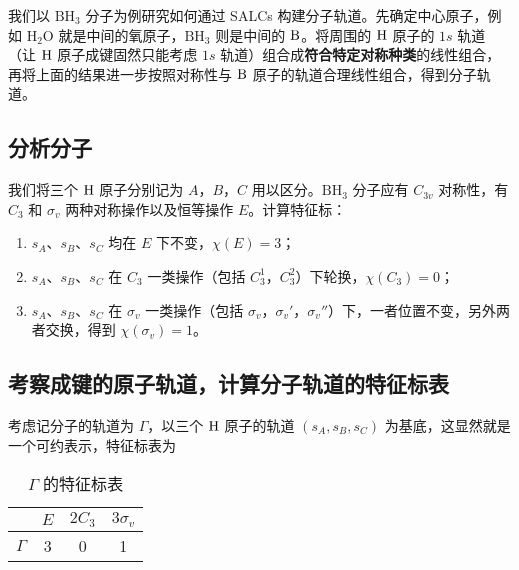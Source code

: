 
我们以 $\text{BH}_3$ 分子为例研究如何通过 SALCs 构建分子轨道。先确定中心原子，例如 $\text{H}_2\text{O}$ 就是中间的氧原子，$\text{BH}_3$ 则是中间的 $\text B$。将周围的 $\text H$ 原子的 $1s$ 轨道（让 $\text H$ 原子成键固然只能考虑 $1s$ 轨道）组合成\textbf{符合特定对称种类}的线性组合，再将上面的结果进一步按照对称性与 $\text B$ 原子的轨道合理线性组合，得到分子轨道。
\subsection{分析分子}

我们将三个 $\text H$ 原子分别记为 $A$，$B$，$C$ 用以区分。$\text{BH}_3$ 分子应有 $C_{3v}$ 对称性，有 $C_3$ 和 $\sigma_v$ 两种对称操作以及恒等操作 $E$。计算特征标：
\begin{enumerate}
\item $s_A$、$s_B$、$s_C$ 均在 $E$ 下不变，$\chi(E)=3$；
\item $s_A$、$s_B$、$s_C$ 在 $C_3$ 一类操作（包括 $C_3^1$，$C_3^2$）下轮换，$\chi(C_3)=0$；
\item $s_A$、$s_B$、$s_C$ 在 $\sigma_v$ 一类操作（包括 $\sigma_v$，$\sigma_v'$，$\sigma_v''$）下，一者位置不变，另外两者交换，得到 $\chi(\sigma_v)=1$。
\end{enumerate}

\subsection{考察成键的原子轨道，计算分子轨道的特征标表}
考虑记分子的轨道为 $\Gamma$，以三个 $\text H$ 原子的轨道 $(s_A,s_B,s_C)$ 为基底，这显然就是一个可约表示，特征标表为
\begin{table}[ht]
\centering
\caption{$\Gamma$ 的特征标表}\label{tab_SALCs1}
\begin{tabular}{|c|c|c|c|}
\hline
 & $E$ & $2C_3$ & $3\sigma_v$ \\
\hline
$\Gamma$ & 3 & 0 & 1 \\
\hline
\end{tabular}
\end{table}
